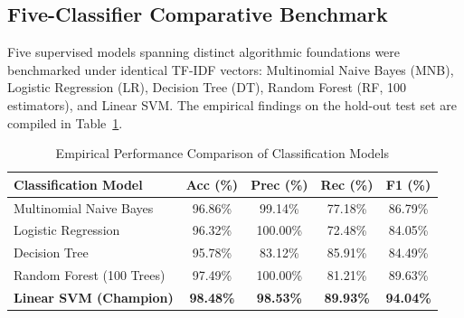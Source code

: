 \documentclass[conference]{IEEEtran}
\begin{document}
\subsection{Five-Classifier Comparative Benchmark}
Five supervised models spanning distinct algorithmic foundations were benchmarked under identical TF-IDF vectors: Multinomial Naive Bayes (MNB), Logistic Regression (LR), Decision Tree (DT), Random Forest (RF, 100 estimators), and Linear SVM. The empirical findings on the hold-out test set are compiled in Table~\ref{tab:results}.

\begin{table}[htbp]
\caption{Empirical Performance Comparison of Classification Models}
\begin{center}
\begin{tabular}{lcccc}
\toprule
\textbf{Classification Model} & \textbf{Acc (\%)} & \textbf{Prec (\%)} & \textbf{Rec (\%)} & \textbf{F1 (\%)} \\
\midrule
Multinomial Naive Bayes & 96.86\% & 99.14\% & 77.18\% & 86.79\% \\
Logistic Regression & 96.32\% & 100.00\% & 72.48\% & 84.05\% \\
Decision Tree & 95.78\% & 83.12\% & 85.91\% & 84.49\% \\
Random Forest (100 Trees) & 97.49\% & 100.00\% & 81.21\% & 89.63\% \\
\textbf{Linear SVM (Champion)} & \textbf{98.48\%} & \textbf{98.53\%} & \textbf{89.93\%} & \textbf{94.04\%} \\
\bottomrule
\end{tabular}
\label{tab:results}
\end{center}
\end{table}
\end{document}
